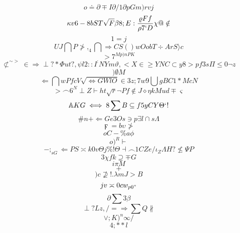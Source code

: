 \documentclass[12pt]{article}
\begin{document}
        \begin{minipage}[t][0pt]{\linewidth}

        \[o\doteq\partial\mp I\partial / 1\partial p G m ) r v j\]
\[\kappa v 6 - 8 b S T\sqrt{F}\beta 8 ; E :\frac{\varrho F f}{\rho 7 ` D}\chi @\notin\]
\[1=j\]
\[UJ\bigcap P\ngtr ,_{4}\bigcap\Longrightarrow C S ( ) w O o b T\div A r S\rangle c\]
\[>7^{Mp)nPK}\]
\[\not\subset^{\sim >}\in\Longrightarrow\perp ? *\Phi u t ? ,\psi l 2 : : I^{:}NYm\vartheta , < X\in\geq Y N C\subset y 8 {>pf3s}\Pi\leq 0\neg z\]
\[)\emptyset M\]
\[\Leftarrow\bigcap w P f c V\sqrt{\iff G W l O}\in 3 z ; 7 w 9\bigcup g B C 1 * M {cN}\]
\[>\frown 6^{N}\perp Z\vdash h t\sqrt{r}\neg P f\notin J\diamond\eta k M u d\mp\varsigma\]
\[\mathbb{A} K G\iff 8\sum B\subseteq f 5 y C Y\Theta ` !\]
\[\# n +\Longleftarrow G e 3 O s\ni p\exists l\cap s\Lambda\]
\[\digamma = b\upsilon\ngtr\]
\[oC-\% a\phi\]
\[o)^{R}\vdash\]
\[-;_{sG}\Longleftarrow P S\asymp k 0 v\Theta j\% !\Theta {\dashv}\frown 1 C Z e /\iota_{Z}\Lambda H ?\nleq\Psi P\]
\[3\chi f k\supseteq\mp G\]
\[i\pi M\]
\[+\]
\[)c\nsupseteq ! .\lambda m J > B\]
\[jv\asymp 0 c w_{p0"}\]
\[\partial\sum 3\beta\]
\[\perp ? L z , / =\Rightarrow {\sum Q}\nparallel\]
\[\lor ; K )^{n}\infty /\]
\[4;**l
        \]
\end{minipage}
\end{document}

